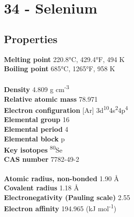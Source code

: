 \section{34 - Selenium}
\label{sec:elem-selenium}
\subsection{Properties}
\textbf{Melting point} 220.8°C, 429.4°F, 494 K\\
\textbf{Boiling point} 685°C, 1265°F, 958 K\\
\\
\textbf{Density} 4.809 g cm\textsuperscript{-3}\\
\textbf{Relative atomic mass} 78.971\\
\textbf{Electron configuration} [Ar] 3d\textsuperscript{10}4s\textsuperscript{2}4p\textsuperscript{4}\\
\textbf{Elemental group} 16\\
\textbf{Elemental period} 4\\
\textbf{Elemental block} p\\
\textbf{Key isotopes} \textsuperscript{80}Se\\
\textbf{CAS number} 7782-49-2\\
\\
\textbf{Atomic radius, non-bonded} 1.90 Å\\
\textbf{Covalent radius} 1.18 Å\\
\textbf{Electronegativity (Pauling scale)} 2.55\\
\textbf{Electron affinity} 194.965 (kJ mol\textsuperscript{-1})\\